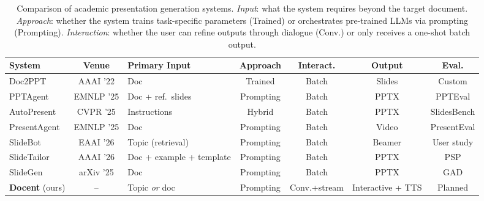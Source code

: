 \documentclass[11pt,a4paper]{article}
\begin{document}
\begin{table}[H]
\centering
\scriptsize
\caption{Comparison of academic presentation generation systems.
\emph{Input}: what the system requires beyond the target document.
\emph{Approach}: whether the system trains task-specific parameters (Trained) or orchestrates pre-trained LLMs via prompting (Prompting).
\emph{Interaction}: whether the user can refine outputs through dialogue (Conv.) or only receives a one-shot batch output.}
\label{tab:academic}
\renewcommand{\arraystretch}{1.15}
\setlength{\tabcolsep}{3pt}
\begin{tabularx}{\textwidth}{@{} >{\raggedright\arraybackslash}p{2.1cm} c >{\raggedright\arraybackslash}X c c c c @{}}
\toprule
\textbf{System}
  & \textbf{Venue}
  & \textbf{Primary Input}
  & \textbf{Approach}
  & \textbf{Interact.}
  & \textbf{Output}
  & \textbf{Eval.} \\
\midrule
Doc2PPT \newline{\scriptsize\citep{fu2022doc2ppt}}
  & AAAI '22
  & Doc
  & Trained
  & Batch
  & Slides
  & Custom \\
PPTAgent \newline{\scriptsize\citep{zheng2025pptagent}}
  & EMNLP '25
  & Doc + ref.\ slides
  & Prompting
  & Batch
  & PPTX
  & PPTEval \\
AutoPresent \newline{\scriptsize\citep{ge2025autopresent}}
  & CVPR '25
  & Instructions
  & Hybrid
  & Batch
  & PPTX
  & SlidesBench \\
PresentAgent \newline{\scriptsize\citep{wu2025presentagent}}
  & EMNLP '25
  & Doc
  & Prompting
  & Batch
  & Video
  & PresentEval \\
SlideBot \newline{\scriptsize\citep{xie2026slidebot}}
  & EAAI '26
  & Topic (retrieval)
  & Prompting
  & Batch
  & Beamer
  & User study \\
SlideTailor \newline{\scriptsize\citep{zeng2026slidetailor}}
  & AAAI '26
  & Doc + example + template
  & Prompting
  & Batch
  & PPTX
  & PSP \\
SlideGen \newline{\scriptsize\citep{liang2025slidegen}}
  & arXiv '25
  & Doc
  & Prompting
  & Batch
  & PPTX
  & GAD \\
\midrule
\textbf{Docent} (ours)
  & --
  & Topic \emph{or} doc
  & Prompting
  & Conv.+stream
  & Interactive + TTS
  & Planned \\
\bottomrule
\end{tabularx}
\setlength{\tabcolsep}{6pt}
\end{table}
\end{document}
